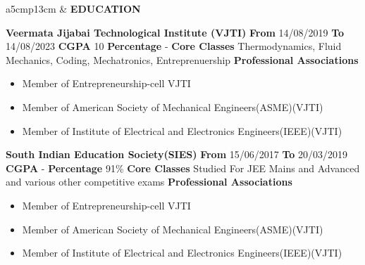 \documentclass{article}
\begin{document}
{\begin{longtable}{ a{5cm}p{13cm} }
&
\newline
{\large{\textbf{\uppercase{Education}}}}\newline

\textbf{Veermata Jijabai Technological Institute (VJTI) } \newline \textbf{From} 14/08/2019 \textbf{To} 14/08/2023 \hspace{1cm} \textbf{CGPA} 10 \hspace{1cm}  \textbf{Percentage} - \newline \textbf{Core Classes}
Thermodynamics, Fluid Mechanics, Coding, Mechatronics, Entreprenuership \newline
\textbf{Professional Associations} 
\begin{itemize}[noitemsep,nolistsep]
	\item Member of Entrepreneurship-cell VJTI
    \item Member of American Society of Mechanical Engineers(ASME)(VJTI)
    \item Member of Institute of Electrical and Electronics Engineers(IEEE)(VJTI)\newline
\end{itemize} 


\textbf{South Indian Education Society(SIES)} \newline \textbf{From} 15/06/2017 \textbf{To} 20/03/2019 \hspace{1cm}  \textbf{CGPA} -  \hspace{1cm}      \textbf{Percentage} 91\% \newline \textbf{Core Classes}
Studied For JEE Mains and Advanced and various other competitive exams \newline
\textbf{Professional Associations} 
\begin{itemize}[noitemsep,nolistsep]
	\item Member of Entrepreneurship-cell VJTI
    \item Member of American Society of Mechanical Engineers(ASME)(VJTI)
    \item Member of Institute of Electrical and Electronics Engineers(IEEE)(VJTI)\newline
\end{itemize} 


\end{longtable}}
\end{document}
